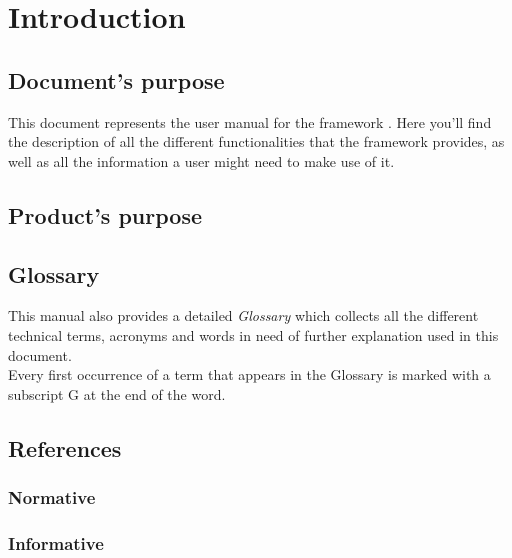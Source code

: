 \section{Introduction}

\subsection{Document's purpose}
This document represents the user manual for the framework \ProjectName{}. Here you'll find the description of all the different functionalities that the framework provides, as well as all the information a user might need to make use of it.


\subsection{Product's purpose}
\ScopoDelProdottoEng{}

\subsection{Glossary}
This manual also provides a detailed \textit{Glossary} which collects all the different technical terms, acronyms and words in need of further explanation used in this document.\\
Every first occurrence of a term that appears in the Glossary is marked with a subscript G at the end of the word.

\subsection{References}
\subsubsection{Normative}
\subsubsection{Informative}
